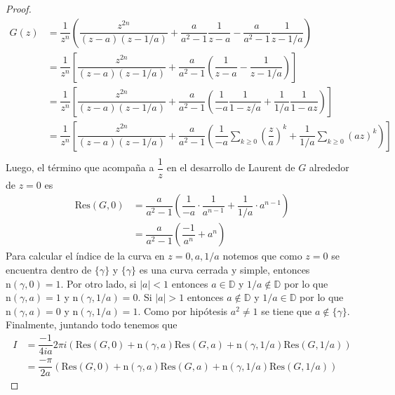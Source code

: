 \documentclass{article}
\newcommand{\D}{\mathbb{D}}
\begin{document}
\begin{proof}
\begin{align*}
        G(z) & = \dfrac{1}{z^n} \left( \dfrac{z^{2n}}{(z-a)(z-1/a)} + \dfrac{a}{a^2 - 1} \dfrac{1}{z-a} - \dfrac{a}{a^2 - 1} \dfrac{1}{z-1/a} \right)                                                                   \\
             & = \dfrac{1}{z^n} \left[ \dfrac{z^{2n}}{(z-a)(z-1/a)} + \dfrac{a}{a^2 - 1} \left( \dfrac{1}{z-a} - \dfrac{1}{z-1/a} \right) \right]                                                                       \\
             & = \dfrac{1}{z^n} \left[ \dfrac{z^{2n}}{(z-a)(z-1/a)} + \dfrac{a}{a^2 - 1} \left( \dfrac{1}{-a} \dfrac{1}{1-z/a} + \dfrac{1}{1/a} \dfrac{1}{1-az} \right) \right]                                         \\
             & = \dfrac{1}{z^n} \left[ \dfrac{z^{2n}}{(z-a)(z-1/a)} + \dfrac{a}{a^2 - 1} \left( \dfrac{1}{-a} \sum_{k \geq 0} {\left( \dfrac{z}{a} \right)}^k + \dfrac{1}{1/a} \sum_{k \geq 0} {(az)}^k \right) \right] \\
    \end{align*}
    Luego, el término que acompaña a \( \dfrac{1}{z} \) en el desarrollo de Laurent de \( G \) alrededor de \( z = 0 \) es \begin{align*}
        \text{Res}(G, 0) & = \dfrac{a}{a^2 - 1} \left( \dfrac{1}{-a} \cdot \dfrac{1}{a^{n-1}} + \dfrac{1}{1/a} \cdot a^{n-1} \right) \\
                         & = \dfrac{a}{a^2 - 1} \left( \dfrac{-1}{a^n} + a^n \right )
    \end{align*}
    Para calcular el índice de la curva en \( z = 0, a, 1/a \) notemos que como \( z = 0 \) se encuentra dentro de \( \{ \gamma \} \) y \( \{ \gamma \} \) es una curva cerrada y simple, entonces \( \text{n}(\gamma, 0) = 1 \).
    Por otro lado, si \( |a| < 1 \) entonces \( a \in \D \) y \( 1/a \notin \D \)
    por lo que \( \text{n}(\gamma, a) = 1 \) y \( \text{n}(\gamma, 1/a) = 0 \). Si \( |a| > 1 \)
    entonces \( a \notin \D \) y \( 1/a \in \D \) por lo que \( \text{n}(\gamma, a) = 0 \) y \( \text{n}(\gamma, 1/a) = 1 \). Como por hipótesis \( a^2 \neq 1 \) se tiene que \( a \notin \{ \gamma \} \).
    Finalmente, juntando todo tenemos que \begin{align*}
        I & = \dfrac{-1}{4 i a} 2 \pi i \left( \text{Res}(G, 0) + \text{n}(\gamma, a) \text{Res}(G, a) + \text{n}(\gamma, 1/a) \text{Res}(G, 1/a) \right) \\
          & = \dfrac{-\pi}{2a} \left( \text{Res}(G, 0) + \text{n}(\gamma, a) \text{Res}(G, a) + \text{n}(\gamma, 1/a) \text{Res}(G, 1/a) \right)

\end{align*}
\end{proof}
\end{document}
